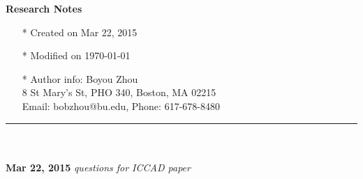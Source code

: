 \documentclass[]{article}
\begin{document}
\pagestyle{empty}
{\large\textbf{Research Notes}}
\begin{itemize}
    \item[*] Created on Mar 22, 2015
    \item[*] Modified on \today
    \item[*] Author info: Boyou Zhou\\
             8 St Mary's St, PHO 340, Boston, MA 02215\\
             Email: bobzhou@bu.edu, Phone: 617-678-8480
\end{itemize}


\rule[-0.1cm]{7.5in}{0.01cm}\\
\\

\noindent \textbf{Mar 22, 2015}
\textit{questions for ICCAD paper}
\indent		\begin{itemize}


\end{itemize}
\end{document}
